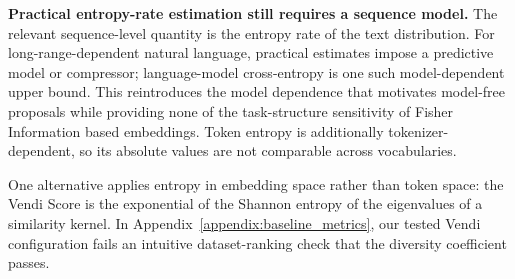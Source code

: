 \textbf{Practical entropy-rate estimation still requires a sequence model.}
The relevant sequence-level quantity is the entropy rate of the text distribution.
For long-range-dependent natural language, practical estimates impose a predictive model or compressor; language-model cross-entropy is one such model-dependent upper bound.
This reintroduces the model dependence that motivates model-free proposals while providing none of the task-structure sensitivity of Fisher Information based embeddings.
Token entropy is additionally tokenizer-dependent, so its absolute values are not comparable across vocabularies.

One alternative applies entropy in embedding space rather than token space: the Vendi Score \citep{friedman2022vendi} is the exponential of the Shannon entropy of the eigenvalues of a similarity kernel.
In Appendix~\ref{appendix:baseline_metrics}, our tested Vendi configuration fails an intuitive dataset-ranking check that the diversity coefficient passes.



